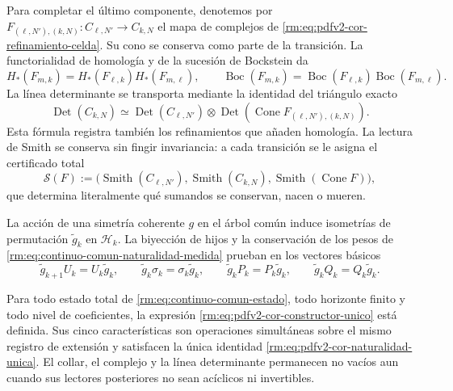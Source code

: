Para completar el último componente, denotemos por
\(F_{(\ell,N'),(k,N)}:C_{\ell,N'}\to C_{k,N}\) el mapa de complejos de
\eqref{rm:eq:pdfv2-cor-refinamiento-celda}. Su cono se conserva como parte de la
transición. La functorialidad de homología y de la sucesión de Bockstein da
\begin{equation}
\label{rm:eq:pdfv2-cor-naturalidad-homologia-bockstein}
 H_*(F_{m,k})=H_*(F_{\ell,k})H_*(F_{m,\ell}),
 \qquad
 \operatorname{Boc}(F_{m,k})
 =\operatorname{Boc}(F_{\ell,k})
  \operatorname{Boc}(F_{m,\ell}).
\end{equation}
La línea determinante se transporta mediante la identidad del triángulo
exacto
\begin{equation}
\label{rm:eq:pdfv2-cor-naturalidad-determinante}
 \operatorname{Det}(C_{k,N})
 \simeq
 \operatorname{Det}(C_{\ell,N'})\otimes
 \operatorname{Det}\!\left(\operatorname{Cone}
 F_{(\ell,N'),(k,N)}\right).
\end{equation}
Esta fórmula registra también los refinamientos que añaden homología. La
lectura de Smith se conserva sin fingir invariancia: a cada transición se le
asigna el certificado total
\begin{equation}
\label{rm:eq:pdfv2-cor-transicion-smith}
 \mathcal S(F):=
 \bigl(\operatorname{Smith}(C_{\ell,N'}),
       \operatorname{Smith}(C_{k,N}),
       \operatorname{Smith}(\operatorname{Cone}F)\bigr),
\end{equation}
que determina literalmente qué sumandos se conservan, nacen o mueren.

La acción de una simetría coherente \(g\) en el árbol común induce
isometrías de permutación \(\widetilde g_k\) en
\(\mathscr H_k\). La biyección de hijos y la conservación de los pesos de
\eqref{rm:eq:continuo-comun-naturalidad-medida} prueban en los vectores básicos
\begin{equation}
\label{rm:eq:pdfv2-cor-naturalidad-transporte-hojas}
 \widetilde g_{k+1}U_k=U_k\widetilde g_k,
 \qquad
 \widetilde g_k\sigma_k=\sigma_k\widetilde g_k,
 \qquad
 \widetilde g_kP_k=P_k\widetilde g_k,
 \qquad
 \widetilde g_kQ_k=Q_k\widetilde g_k.
\end{equation}

\begin{theorem}
\label{rm:thm:pdfv2-cor-totalidad-naturalidad}
Para todo estado total de \eqref{rm:eq:continuo-comun-estado}, todo horizonte
finito y todo nivel de coeficientes, la expresión
\eqref{rm:eq:pdfv2-cor-constructor-unico} está definida. Sus cinco
características son operaciones simultáneas sobre el mismo registro de
extensión y satisfacen la única identidad
\eqref{rm:eq:pdfv2-cor-naturalidad-unica}. El collar, el complejo y la línea
determinante permanecen no vacíos aun cuando sus lectores posteriores no
sean acíclicos ni invertibles.
\end{theorem}

